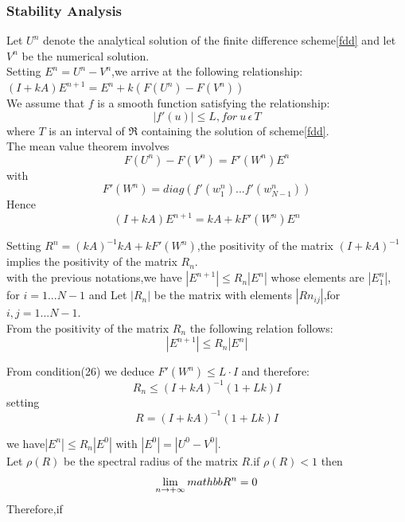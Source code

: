 \documentclass[12pt]{article}
\numberwithin{equation}{section} %
\begin{document}
\subsubsection{Stability Analysis}
Let $U^n$ denote the analytical solution of the finite
difference scheme\ref{fdd} and let $V^n$ be the numerical solution.\\
Setting $E^n=U^n-V^n$,we arrive at the following relationship:\\
$(I+kA)E^{n+1}=E^n +k(F(U^n)-F(V^n))$\\
We assume that $f$ is a smooth function satisfying
the relationship:\\
\begin{equation}
|f'(u)|\leq L,  for \: u \, \epsilon \,T
\end{equation}
 where $T$ is an interval of $\Re$ containing the solution of scheme\ref{fdd}.\\
The mean value theorem involves\\
\begin{equation*}
F(U^n)-F(V^n)=F'(W^n)E^n
\end{equation*}
with
\begin{equation*}
F'(W^n)=diag(f'(w_1^n)...f'(w^n_{N-1}))
\end{equation*}
Hence
\begin{equation*}
 (I+kA)E^{n+1}=kA+kF'(W^n)E^n
 \end{equation*}

Setting $R^n=(kA)^{-1}kA + kF'(W^n)$,the positivity of the matrix
$(I+kA)^{-1}$ implies the positivity of the matrix $R_n$.\\
with the previous notations,we have $|E^{n+1}|\leq R_n|E^n|$ whose
elements are $|E^n_1|$, for $i=1...N-1$ and Let $|R_n| $ be the
matrix with elements $|Rn_{ij}|$,for $i,j=1...N-1$.\\
From the positivity of the matrix $R_n$ the following relation
follows:
\begin{equation*}
|E^{n+1}|\leq R_n|E^n|
\end{equation*}

From condition(26) we deduce $F'(W^n)\leq L\cdot I $ and therefore:
\begin{equation*}
R_n\leq(I+kA)^{-1}(1+Lk)I
\end{equation*}
setting
\begin{equation*}
R=(I+kA)^{-1}(1+Lk)I
\end{equation*}

we have$|E^{n}|\leq R_n|E^0|$ with $|E^0|=|U^0-V^0|$.\\
Let $\rho(R)$ be the spectral radius of the matrix $R$.if
$\rho(R)<1$ then
\begin{equation*}
\lim_{n \rightarrow +\infty} \\mathbb{R}^{n} = 0
\end{equation*}
Therefore,if
\end{document}
